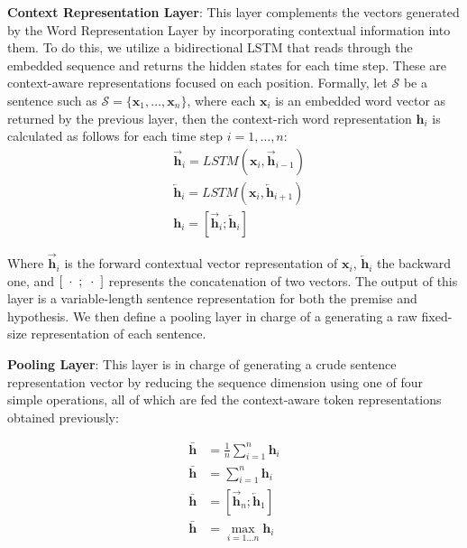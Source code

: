 \documentclass[11pt,letterpaper]{article}
\begin{document}
\textbf{Context Representation Layer}: This layer complements the vectors generated by the Word Representation Layer by incorporating contextual information into them. To do this, we utilize a bidirectional LSTM that reads through the embedded sequence and returns the hidden states for each time step. These are context-aware representations focused on each position. Formally, let $\mathcal{S}$ be a sentence such as $\mathcal{S} = \{\bm{x}_1,\ldots,\bm{x}_n\}$, where each $\bm{x}_i$ is an embedded word vector as returned by the previous layer, then the context-rich word representation $\bm{h}_i$ is calculated as follows for each time step $i=1,\ldots,n$:
\begin{align}
&\overrightarrow{\bm{h}}_i = LSTM(\bm{x}_i, \overrightarrow{\bm{h}}_{i-1})\\
&\overleftarrow{\bm{h}}_i = LSTM(\bm{x}_i, \overleftarrow{\bm{h}}_{i+1})\\
&\bm{h}_i = [\overrightarrow{\bm{h}}_i ; \overleftarrow{\bm{h}}_i]
\end{align}


%

\noindent Where $\overrightarrow{\bm{h}}_i$ is the forward contextual vector representation of $\bm{x}_i$, $\overleftarrow{\bm{h}}_i$ the backward one, and $[\enskip \cdot \enskip;\enskip \cdot \enskip]$ represents the concatenation of two vectors. The output of this layer is a variable-length sentence representation for both the premise and hypothesis. We then define a pooling layer in charge of a generating a raw fixed-size representation of each sentence.

\textbf{Pooling Layer}: This layer is in charge of generating a crude sentence representation vector by reducing the sequence dimension using one of four simple operations, all of which are fed the context-aware token representations obtained previously:

\begin{align}
\label{mean-pool}\bar{\bm{h}} &= \frac1n \sum_{i=1}^n \bm{h}_i\\
\label{sum-pool}\bar{\bm{h}} &= \sum_{i=1}^n \bm{h}_i\\
\label{last-pool}\bar{\bm{h}} &= [\overrightarrow{\bm{h}}_n; \overleftarrow{\bm{h}}_1]\\
\label{max-pool}\bar{\bm{h}} &= \max_{i= 1 ... n} \bm{h}_i
\end{align}
\end{document}
